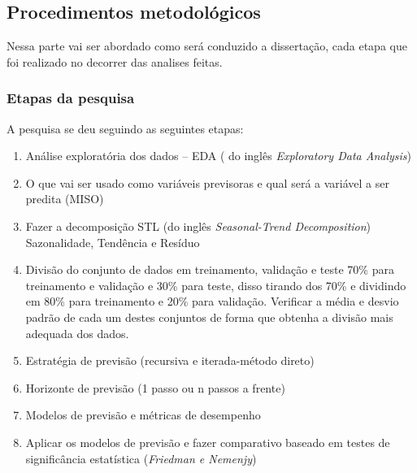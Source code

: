 \subsection{Procedimentos metodol{\'o}gicos} \label{subsec:metod}

Nessa parte vai ser abordado como será conduzido a dissertação, cada etapa que foi realizado no decorrer das analises feitas.
   
    \subsubsection{Etapas da pesquisa}\label{subsubsec:etp}
    A pesquisa se deu seguindo as seguintes etapas:
    
    \begin{enumerate}[start=1, label = {\textbf{Etapa} \arabic* } ]
    	\item Análise exploratória dos dados – EDA ( do inglês \textit{Exploratory Data Analysis}) \label{etp:1}
    	\item O que vai ser usado como variáveis previsoras e qual será a variável a ser predita (MISO) \label{etp:2}
    	\item Fazer a decomposição STL (do inglês \textit{Seasonal-Trend Decomposition}) Sazonalidade, Tendência e Resíduo \label{etp:3}
    	\item Divisão do conjunto de dados em treinamento, validação e teste 70\% para treinamento e validação e 30\% para teste, disso tirando dos 70\% e dividindo em 80\% para treinamento e 20\% para validação. Verificar a média e desvio padrão de cada um destes conjuntos de forma que obtenha a divisão mais adequada dos dados. \label{etp:4}
    	\item Estratégia de previsão (recursiva e iterada-método direto) \label{etp:5}
    	\item Horizonte de previsão (1 passo ou n passos a frente) \label{etp:6}
    	\item Modelos de previsão e métricas de desempenho \label{etp:7}
    	\item Aplicar os modelos de previsão e fazer comparativo baseado em testes de significância estatística (\textit{Friedman e Nemenjy}) \label{etp:9}
    \end{enumerate}

